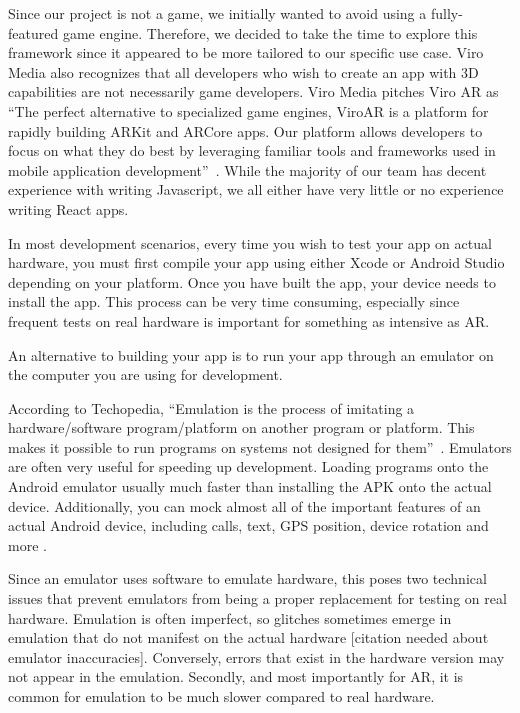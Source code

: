 \documentclass[a4paper, 10pt, american, titlepage]{article}
\begin{document}
Since our project is not a game, we initially wanted to avoid using a
fully-featured game engine. Therefore, we decided to take the time to explore
this framework since it appeared to be more tailored to our specific use case.
Viro Media also recognizes that all developers who wish to create an app with
3D capabilities are not necessarily game developers. Viro Media pitches Viro
AR as ``The perfect alternative to specialized game engines, ViroAR is a
platform for rapidly building ARKit and ARCore apps. Our platform allows
developers to focus on what they do best by leveraging familiar tools and
frameworks used in mobile application development''~\autocite{viro2019}.
While the majority of our team has decent experience with writing Javascript,
we all either have very little or no experience writing React apps.

In most development scenarios, every time you wish to test your app on actual
hardware, you must first compile your app using either Xcode or Android Studio
depending on your platform. Once you have built the app, your device needs to
install the app. This process can be very time consuming, especially since
frequent tests on real hardware is important for something as intensive as
AR.

An alternative to building your app is to run your app through an emulator on
the computer you are using for development.

According to Techopedia, ``Emulation is the process of imitating a
hardware/software program/platform on another program or platform. This makes
it possible to run programs on systems not designed for
them''~\autocite{techopedia2019}. Emulators are often very useful for speeding
up development. Loading programs onto the Android emulator usually much faster
than installing the APK onto the actual device. Additionally, you can mock
almost all of the important features of an actual Android device, including
calls, text, GPS position, device rotation and more \autocite{androidemulator}.

Since an emulator uses software to emulate hardware, this poses two technical
issues that prevent emulators from being a proper replacement for testing on
real hardware.  Emulation is often imperfect, so glitches sometimes emerge in
emulation that do not manifest on the actual hardware [citation needed about
emulator inaccuracies]. Conversely, errors that exist in the hardware version
may not appear in the emulation. Secondly, and most importantly for AR, it is
common for emulation to be much slower compared to real hardware.
\end{document}
